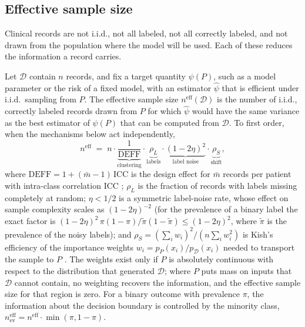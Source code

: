 \documentclass[acmsmall,screen,review]{acmart}
\newcommand{\eff}{\mathrm{eff}}
\theoremstyle{acmdefinition}
\begin{document}
\subsection{Effective sample size}

Clinical records are not i.i.d., not all labeled, not all correctly labeled, and not drawn from the population where the model will be used. Each of these reduces the information a record carries.

\begin{definition}\label{def:ess}
Let $\mathcal{D}$ contain $n$ records, and fix a target quantity $\psi(P)$, such as a model parameter or the risk of a fixed model, with an estimator $\hat{\psi}$ that is efficient under i.i.d.\ sampling from $P$. The effective sample size $n^{\eff}(\mathcal{D})$ is the number of i.i.d., correctly labeled records drawn from $P$ for which $\hat{\psi}$ would have the same variance as the best estimator of $\psi(P)$ that can be computed from $\mathcal{D}$. To first order, when the mechanisms below act independently,
\begin{equation}\label{eq:neff}
n^{\eff} \;=\; n\cdot\underbrace{\frac{1}{\mathrm{DEFF}}}_{\text{clustering}}\cdot\underbrace{\rho_L}_{\text{labels}}\cdot\underbrace{(1-2\eta)^2}_{\text{label noise}}\cdot\underbrace{\rho_S}_{\text{shift}},
\end{equation}
where $\mathrm{DEFF}=1+(\bar{m}-1)\,\mathrm{ICC}$ is the design effect for $\bar{m}$ records per patient with intra-class correlation ICC \cite{kish1965survey}; $\rho_L$ is the fraction of records with labels missing completely at random; $\eta<1/2$ is a symmetric label-noise rate, whose effect on sample complexity scales as $(1-2\eta)^{-2}$ \cite{angluin1988learning} (for the prevalence of a binary label the exact factor is $(1-2\eta)^2\,\pi(1-\pi)/\tilde{\pi}(1-\tilde{\pi})\le(1-2\eta)^2$, where $\tilde{\pi}$ is the prevalence of the noisy labels); and $\rho_S=(\sum_i w_i)^2/(n\sum_i w_i^2)$ is Kish's efficiency of the importance weights $w_i=p_P(x_i)/p_{\mathcal{D}}(x_i)$ needed to transport the sample to $P$ \cite{kish1965survey}. The weights exist only if $P$ is absolutely continuous with respect to the distribution that generated $\mathcal{D}$; where $P$ puts mass on inputs that $\mathcal{D}$ cannot contain, no weighting recovers the information, and the effective sample size for that region is zero. For a binary outcome with prevalence $\pi$, the information about the decision boundary is controlled by the minority class, $n^{\eff}_{\mathrm{ev}}=n^{\eff}\cdot\min(\pi,1-\pi)$.
\end{definition}
\end{document}
